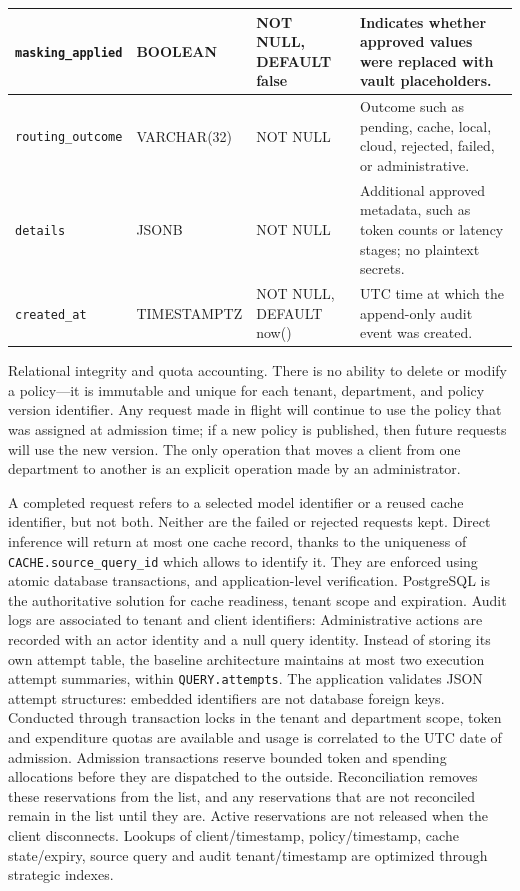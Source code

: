\documentclass{FastFyp}
\begin{document}
\begin{longtable}{|P{3.5cm}|P{2.3cm}|P{2.5cm}|P{6.3cm}|}
\texttt{masking\_applied} & BOOLEAN & NOT NULL, DEFAULT false & Indicates whether approved values were replaced with vault placeholders. \\ \hline
\texttt{routing\_outcome} & VARCHAR(32) & NOT NULL & Outcome such as pending, cache, local, cloud, rejected, failed, or administrative. \\ \hline
\texttt{details} & JSONB & NOT NULL & Additional approved metadata, such as token counts or latency stages; no plaintext secrets. \\ \hline
\texttt{created\_at} & TIMESTAMPTZ & NOT NULL, DEFAULT now() & UTC time at which the append-only audit event was created. \\ \hline
\end{longtable}
\endgroup

\noindent Relational integrity and quota accounting.
There is no ability to delete or modify a policy—it is immutable and unique for each tenant, department, and policy version identifier. Any request made in flight will continue to use the policy that was assigned at admission time; if a new policy is published, then future requests will use the new version. The only operation that moves a client from one department to another is an explicit operation made by an administrator.

A completed request refers to a selected model identifier or a reused cache identifier, but not both. Neither are the failed or rejected requests kept. Direct inference will return at most one cache record, thanks to the uniqueness of \texttt{CACHE.source\_query\_id} which allows to identify it. They are enforced using atomic database transactions, and application-level verification. PostgreSQL is the authoritative solution for cache readiness, tenant scope and expiration. Audit logs are associated to tenant and client identifiers: Administrative actions are recorded with an actor identity and a null query identity.
Instead of storing its own attempt table, the baseline architecture maintains at most two execution attempt summaries, within \texttt{QUERY.attempts}. The application validates JSON attempt structures: embedded identifiers are not database foreign keys. Conducted through transaction locks in the tenant and department scope, token and expenditure quotas are available and usage is correlated to the UTC date of admission.
Admission transactions reserve bounded token and spending allocations before they are dispatched to the outside. Reconciliation removes these reservations from the list, and any reservations that are not reconciled remain in the list until they are. Active reservations are not released when the client disconnects. Lookups of client/timestamp, policy/timestamp, cache state/expiry, source query and audit tenant/timestamp are optimized through strategic indexes.
\end{document}
